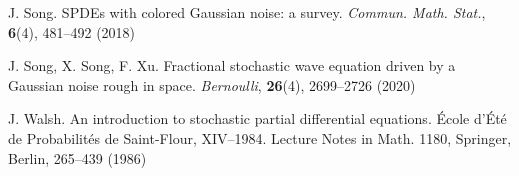 \documentclass[11pt,reqno]{amsart}
\numberwithin{equation}{section}
\newcommand{\1}{{\bf 1}}
\newcommand{\2}{{\bf 2}}
\begin{document}
\begin{thebibliography}{}
J. Song. SPDEs with colored Gaussian noise: a survey. {\it Commun. Math. Stat.}, \textbf{6}(4), 481--492 (2018)

J. Song, X. Song, F. Xu. Fractional stochastic wave equation driven by a Gaussian noise rough in space. {\it Bernoulli}, \textbf{26}(4), 2699--2726 (2020)

J. Walsh. An introduction to stochastic partial differential equations. \'Ecole d'\'Et\'e de Probabilités de Saint-Flour, XIV--1984. Lecture Notes in Math. 1180, Springer, Berlin, 265--439 (1986)      
     \end{thebibliography}
\vskip0.8cm



    
\end{document}

